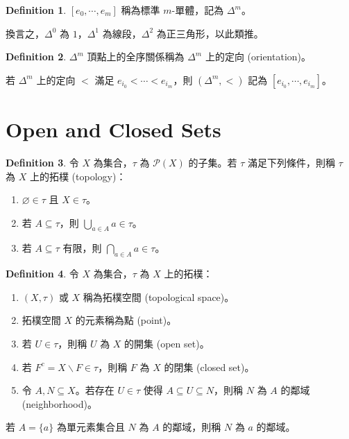 \documentclass[12pt]{article}
\theoremstyle{definition}
\newtheorem{definition}{Definition}[section]
\newcommand\<{\langle}
\renewcommand\>{\rangle}
\begin{document}
\begin{CJK}{UTF8}{bsmi}
\begin{definition}
    $[e_0, \cdots, e_m]$ 稱為標準 $m$-單體，記為 $\Delta^m$。
\end{definition}

換言之，$\Delta^0$ 為 $1$，$\Delta^1$ 為線段，$\Delta^2$ 為正三角形，以此類推。

\begin{definition}
    $\Delta^m$ 頂點上的全序關係稱為 $\Delta^m$ 上的定向 (orientation)。
\end{definition}

若 $\Delta^m$ 上的定向 $<$ 滿足 $e_{i_0}<\cdots<e_{i_m}$，則 $(\Delta^m, <)$ 記為 $[e_{i_0}, \cdots, e_{i_m}]$。

\section{Open and Closed Sets}

\begin{definition}
    令 $X$ 為集合，$\tau$ 為 $\mathcal{P}(X)$ 的子集。若 $\tau$ 滿足下列條件，則稱 $\tau$ 為 $X$ 上的拓樸 (topology)：
    \begin{enumerate}
        \item $\varnothing\in\tau$ 且 $X\in\tau$。
        \item 若 $A\subseteq\tau$，則 $\bigcup_{a\in A}a\in\tau$。
        \item 若 $A\subseteq\tau$ 有限，則 $\bigcap_{a\in A}a\in\tau$。
    \end{enumerate}
\end{definition}

\begin{definition}
    令 $X$ 為集合，$\tau$ 為 $X$ 上的拓樸：
    \begin{enumerate}
        \item $(X, \tau)$ 或 $X$ 稱為拓樸空間 (topological space)。
        \item 拓樸空間 $X$ 的元素稱為點 (point)。
        \item 若 $U\in\tau$，則稱 $U$ 為 $X$ 的開集 (open set)。
        \item 若 $F^c=X\backslash F\in\tau$，則稱 $F$ 為 $X$ 的閉集 (closed set)。
        \item 令 $A, N\subseteq X$。若存在 $U\in\tau$ 使得 $A\subseteq U\subseteq N$，則稱 $N$ 為 $A$ 的鄰域 (neighborhood)。
    \end{enumerate}
\end{definition}

若 $A=\{a\}$ 為單元素集合且 $N$ 為 $A$ 的鄰域，則稱 $N$ 為 $a$ 的鄰域。


\end{CJK}
\end{document}
